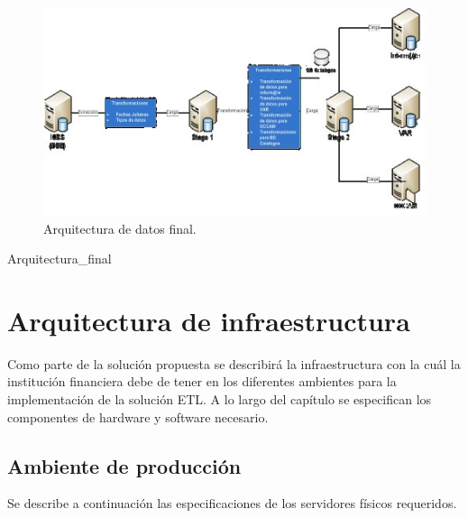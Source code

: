 \begin{figure}[htb]
  \begin{center}
    \includegraphics[width=0.8\linewidth]{Arquitectura_final.jpg}
    \caption{Arquitectura de datos final.}
    \label{fig:arquitectura-de-datos-final}
  \end{center}
\end{figure}

Arquitectura\_final %

\section{Arquitectura de infraestructura}
Como parte de la solución propuesta se describirá la infraestructura con la cuál la institución financiera debe de tener en los diferentes ambientes para la implementación de la solución ETL.
A lo largo del capítulo se especifican los componentes de hardware y software necesario. 

\subsection{Ambiente de producción}
Se describe a continuación las especificaciones de los servidores físicos requeridos.



\cleardoublepage

